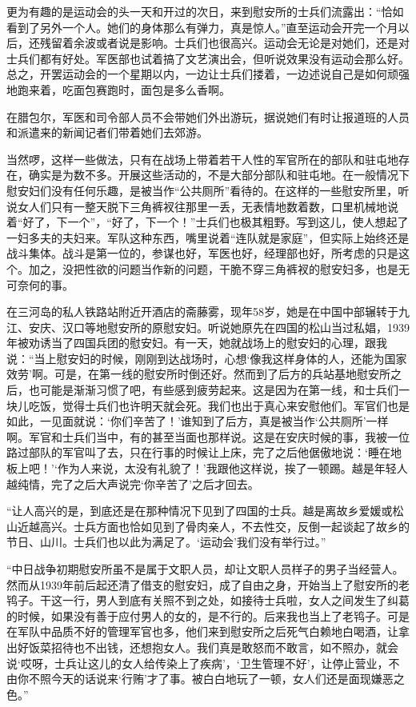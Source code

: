 \documentclass[12pt,UTF8]{ctexbook}
\begin{document}
更为有趣的是运动会的头一天和开过的次日，来到慰安所的士兵们流露出：“恰如看到了另外一个人。她们的身体那么有弹力，真是惊人。”直至运动会开完一个月以后，还残留着余波或者说是影响。士兵们也很高兴。运动会无论是对她们，还是对士兵们都有好处。军医部也试着搞了文艺演出会，但听说效果没有运动会那么好。总之，开罢运动会的一个星期以内，一边让士兵们搂着，一边述说自己是如何顽强地跑来着，吃面包赛跑时，面包是多么香啊。

在腊包尔，军医和司令部人员不会带她们外出游玩，据说她们有时让报道班的人员和派遣来的新闻记者们带着她们去郊游。

当然啰，这样一些做法，只有在战场上带着若干人性的军官所在的部队和驻屯地存在，确实是为数不多。开展这些活动的，不是大部分部队和驻屯地。在一般情况下慰安妇们没有任何乐趣，是被当作“公共厕所”看待的。在这样的一些慰安所里，听说女人们只有一整天脱下三角裤衩往那里一丢，无表情地数着数，口里机械地说着“好了，下一个”，“好了，下一个！”士兵们也极其粗野。写到这儿，使人想起了一妇多夫的夫妇来。军队这种东西，嘴里说着“连队就是家庭”，但实际上始终还是战斗集体。战斗是第一位的，参谋也好，军医也好，经理部也好，所考虑的只是这个。加之，没把性欲的问题当作新的问题，干脆不穿三角裤衩的慰安妇多，也是无可奈何的事。

在三河岛的私人铁路站附近开酒店的斋藤雾，现年58岁，她是在中国中部辗转于九江、安庆、汉口等地慰安所的原慰安妇。听说她原先在四国的松山当过私娼，1939年被劝诱当了四国兵团的慰安妇。有一天，她就战场上的慰安妇的心理，跟我说：“当上慰安妇的时候，刚刚到达战场时，心想‘像我这样身体的人，还能为国家效劳’啊。可是，在第一线的慰安所时倒还好。然而到了后方的兵站基地慰安所之后，也可能是渐渐习惯了吧，有些感到疲劳起来。这是因为在第一线，和士兵们一块儿吃饭，觉得士兵们也许明天就会死。我们也出于真心来安慰他们。军官们也是如此，一见面就说：‘你们辛苦了！’谁知到了后方，真是被当作‘公共厕所’一样啊。军官和士兵们当中，有的甚至当面也那样说。这是在安庆时候的事，我被一位路过部队的军官叫了去，只在行事的时候让上床，完了之后他倨傲地说：‘睡在地板上吧！’‘作为人来说，太没有礼貌了！’我跟他这样说，挨了一顿踢。越是年轻人越纯情，完了之后大声说完‘你辛苦了’之后才回去。

“让人高兴的是，到底还是在那种情况下见到了四国的士兵。越是离故乡爱媛或松山近越高兴。士兵方面也恰如见到了骨肉亲人，不去性交，反倒一起谈起了故乡的节日、山川。士兵们也以此为满足了。‘运动会’我们没有举行过。”

“中日战争初期慰安所虽不是属于文职人员，却让文职人员样子的男子当经营人。然而从1939年前后起还清了借支的慰安妇，成了自由之身，开始当上了慰安所的老鸨子。干这一行，男人到底有关照不到之处，如接待士兵啦，女人之间发生了纠葛的时候，如果没有善于应付男人的女的，是不行的。后来我也当上了老鸨子。可是在军队中品质不好的管理军官也多，他们来到慰安所之后死气白赖地白喝酒，让拿出好饭菜招待也不出钱，还想抱女人。我们真是敢怒而不敢言，如不照办，就会说‘哎呀，士兵让这儿的女人给传染上了疾病’，‘卫生管理不好’，让停止营业，不由你不照今天的话说来‘行贿’才了事。被白白地玩了一顿，女人们还是面现嫌恶之色。”
\end{document}
